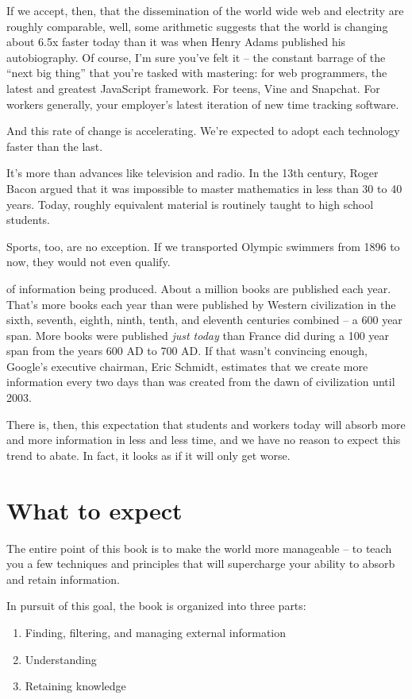 If we accept, then, that the dissemination of the world wide web and electrity are
roughly comparable, well, some arithmetic suggests that the world is
changing about 6.5x faster today than it was when Henry Adams published his
autobiography. Of course, I'm sure you've felt it -- the constant barrage of the
``next big thing'' that you're tasked with mastering: for web programmers, the
latest and greatest JavaScript framework. For teens, Vine and Snapchat. For
workers generally, your employer's latest iteration of new time tracking
software. 

And this rate of change is accelerating. We're expected to adopt each technology faster than the last.

 It's more than
advances like television and radio. In the 13th century, Roger Bacon argued that
it was impossible to master mathematics in less than 30 to 40 years. Today,
roughly equivalent material is routinely taught to high school students.

Sports, too, are no exception. If we transported Olympic swimmers from 1896 to now, they would not even qualify. \cite{ericsson2006influence}

 of information being produced. About a million books are published each year. That's more books each year than were published
by Western civilization in the sixth, seventh, eighth, ninth, tenth, and
eleventh centuries combined -- a 600 year span. More books were published \textit{just
today} than France did during a 100 year span from the years 600 AD to 700
AD.\cite{buringh2009charting} If that wasn't convincing enough, Google's
executive chairman, Eric Schmidt, estimates that we create more information
every two days than was created from the dawn of civilization until 2003.

There is, then, this expectation that students and workers today will absorb
more and more information in less and less time, and we have no reason to expect
this trend to abate. In fact, it looks as if it will only get worse.

\section{What to expect}

 The entire point of this book is to make the world more manageable -- to teach you a few techniques and principles that will supercharge your ability to absorb and retain information. 

In pursuit of this goal, the book is organized into three parts:

\begin{enumerate}
  \item Finding, filtering, and managing external information
  \item Understanding
  \item Retaining knowledge
\end{enumerate}
